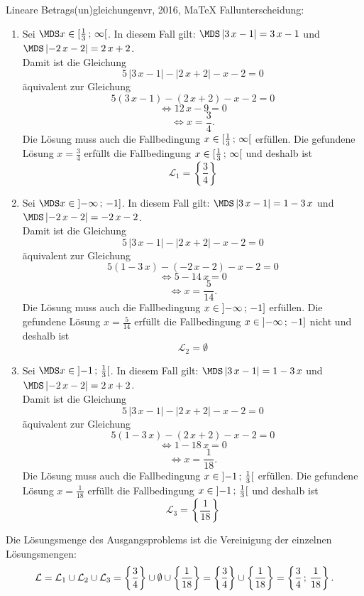 \begin{MAufgabe}{Lineare Betrags(un)gleichungen}{vr, 2016, MaTeX}
 Fallunterscheidung: 

 \begin{enumerate} 
 \item Sei $ \MDS x\in[ \frac{1}{3} \, \MIntvlSep \, \infty\MoIr $. 
 In diesem Fall gilt: 
  $ \MDS \left| 3\, x - 1\right|=3\, x - 1$ und $ \MDS \left|  - 2\, x - 2\right|=2\, x + 2$. \\ 
 Damit ist die Gleichung 
 $$ 
5\, \left|3\, x - 1\right| - \left|2\, x + 2\right| - x - 2= 0
$$
 \"aquivalent zur Gleichung
 $$ 
5\left(3\, x - 1\right)-\left( 2\, x + 2\right)- x-2= 0 
$$  
$$ 
 \Leftrightarrow 12\, x - 9= 0 
$$  
$$ \Leftrightarrow x = \frac{3}{4} . 
 $$ 
 Die L\"osung muss auch die Fallbedingung $x\in [ \frac{1}{3} \, ; \, \infty[\mbox{}  $ erf\"ullen. Die gefundene L\"osung $x=\frac{3}{4}$ erf\"ullt die Fallbedingung  $x\in [ \frac{1}{3} \, ; \, \infty[\mbox{} $ und deshalb ist  $$
 \mathcal{L}_{1}=\left\{\frac{3}{4}\right\}
 $$ 
\item Sei $ \MDS x\in\MoIl  -\infty \, \MIntvlSep \, -1]$. 
 In diesem Fall gilt: 
  $ \MDS \left| 3\, x - 1\right|=1 - 3\, x$ und $ \MDS \left|  - 2\, x - 2\right|= - 2\, x - 2$. \\ 
 Damit ist die Gleichung 
 $$ 
5\, \left|3\, x - 1\right| - \left|2\, x + 2\right| - x - 2= 0
$$
 \"aquivalent zur Gleichung
 $$ 
5\left(1 - 3\, x\right)-\left(  - 2\, x - 2\right)- x-2= 0 
$$  
$$ 
 \Leftrightarrow 5 - 14\, x= 0 
$$  
$$ \Leftrightarrow x = \frac{5}{14} . 
 $$ 
 Die L\"osung muss auch die Fallbedingung $x\in \mbox{}]\mathopen{}  -\infty \, ; \, -1] $ erf\"ullen. Die gefundene L\"osung $x=\frac{5}{14}$ erf\"ullt die Fallbedingung  $x\in \mbox{}]\mathopen{}  -\infty \, ; \, -1]$ nicht und deshalb ist  $$
 \mathcal{L}_{2}=\emptyset 
 $$ 
\item Sei $ \MDS x\in\MoIl  -1 \, \MIntvlSep \, \frac{1}{3}\MoIr $. 
 In diesem Fall gilt: 
  $ \MDS \left| 3\, x - 1\right|=1 - 3\, x$ und $ \MDS \left|  - 2\, x - 2\right|=2\, x + 2$. \\ 
 Damit ist die Gleichung 
 $$ 
5\, \left|3\, x - 1\right| - \left|2\, x + 2\right| - x - 2= 0
$$
 \"aquivalent zur Gleichung
 $$ 
5\left(1 - 3\, x\right)-\left( 2\, x + 2\right)- x-2= 0 
$$  
$$ 
 \Leftrightarrow 1 - 18\, x= 0 
$$  
$$ \Leftrightarrow x = \frac{1}{18} . 
 $$ 
 Die L\"osung muss auch die Fallbedingung $x\in \mbox{}]\mathopen{}  -1 \, ; \, \frac{1}{3}[\mbox{}  $ erf\"ullen. Die gefundene L\"osung $x=\frac{1}{18}$ erf\"ullt die Fallbedingung  $x\in \mbox{}]\mathopen{}  -1 \, ; \, \frac{1}{3}[\mbox{} $ und deshalb ist  $$
 \mathcal{L}_{3}=\left\{\frac{1}{18}\right\}
 $$ 
 \end{enumerate} 
  Die L\"osungsmenge des Ausgangsproblems ist die Vereinigung der einzelnen L\"osungsmengen: 
$$ \mathcal{L} = \mathcal{L}_{1} \cup \mathcal{L}_{2} \cup \mathcal{L}_{3} 
 = \left\{\frac{3}{4}\right\}\cup \emptyset\cup \left\{\frac{1}{18}\right\} 
  =\left\{\frac{3}{4}\right\}\cup\left\{\frac{1}{18}\right\} 
  = \left\{\frac{3}{4}\, ; \,\frac{1}{18}\right\} 
 . $$ 
 

\end{MAufgabe}
